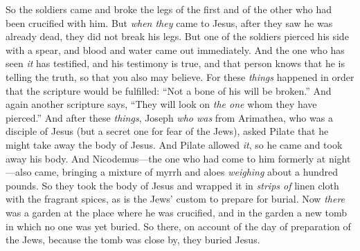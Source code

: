 \begin{biblechapter}
\verse So the soldiers came and broke the legs of the first and of the other who had been crucified with him.
\verse But \textit{when they} came to Jesus, after they saw he was already dead, they did not break his legs.
\verse But one of the soldiers pierced his side with a spear, and blood and water came out immediately.
\verse And the one who has seen \textit{it} has testified, and his testimony is true, and that person knows that he is telling the truth, so that you also may believe.
\verse For these \textit{things} happened in order that the scripture would be fulfilled: “Not a bone of his will be broken.”
\verse And again another scripture says, “They will look on \textit{the one} whom they have pierced.”
 And after these \textit{things}, Joseph \textit{who was} from Arimathea, who was a disciple of Jesus (but a secret one for fear of the Jews), asked Pilate that he might take away the body of Jesus. And Pilate allowed \textit{it}, so he came and took away his body.
\verse And Nicodemus—the one who had come to him formerly at night—also came, bringing a mixture of myrrh and aloes \textit{weighing} about a hundred pounds.
\verse So they took the body of Jesus and wrapped it in \textit{strips of} linen cloth with the fragrant spices, as is the Jews’ custom to prepare for burial.
\verse Now \textit{there} was a garden at the place where he was crucified, and in the garden a new tomb in which no one was yet buried.
\verse So there, on account of the day of preparation of the Jews, because the tomb was close by, they buried Jesus.
\end{biblechapter}

